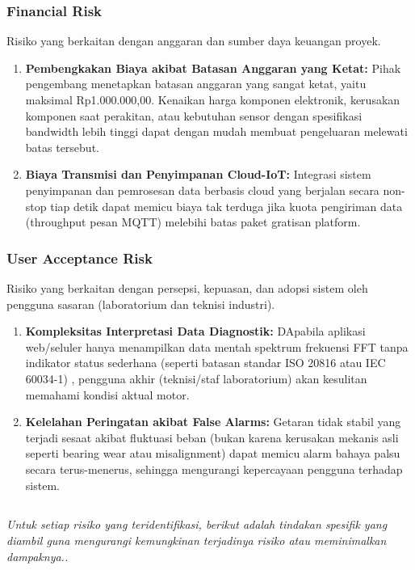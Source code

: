 \documentclass{elsinta}
\begin{document}
\subsubsection*{Financial Risk}
Risiko yang berkaitan dengan anggaran dan sumber daya keuangan proyek.
\begin{enumerate}
    \item \textbf{Pembengkakan Biaya akibat Batasan Anggaran yang Ketat:} Pihak pengembang menetapkan batasan anggaran yang sangat ketat, yaitu maksimal Rp1.000.000,00. Kenaikan harga komponen elektronik, kerusakan komponen saat perakitan, atau kebutuhan sensor dengan spesifikasi bandwidth lebih tinggi dapat dengan mudah membuat pengeluaran melewati batas tersebut.
    \item \textbf{Biaya Transmisi dan Penyimpanan Cloud-IoT:} Integrasi sistem penyimpanan dan pemrosesan data berbasis cloud yang berjalan secara non-stop tiap detik dapat memicu biaya tak terduga jika kuota pengiriman data (throughput pesan MQTT) melebihi batas paket gratisan platform. 
\end{enumerate}

\subsubsection*{User Acceptance Risk}
Risiko yang berkaitan dengan persepsi, kepuasan, dan adopsi sistem oleh pengguna sasaran (laboratorium dan teknisi industri). 
\begin{enumerate}
    \item \textbf{Kompleksitas Interpretasi Data Diagnostik:} DApabila aplikasi web/seluler hanya menampilkan data mentah spektrum frekuensi FFT tanpa indikator status sederhana (seperti batasan standar ISO 20816 atau IEC 60034-1) , pengguna akhir (teknisi/staf laboratorium) akan kesulitan memahami kondisi aktual motor. 
    \item \textbf{ Kelelahan Peringatan akibat False Alarms:} Getaran tidak stabil yang terjadi sesaat akibat fluktuasi beban (bukan karena kerusakan mekanis asli seperti bearing wear atau misalignment) dapat memicu alarm bahaya palsu secara terus-menerus, sehingga mengurangi kepercayaan pengguna terhadap sistem.

\end{enumerate}

\subsection{\RiskMitigationTitle}
\textit{Untuk setiap risiko yang teridentifikasi, berikut adalah tindakan spesifik yang diambil guna mengurangi kemungkinan terjadinya risiko atau meminimalkan dampaknya..}
\end{document}
